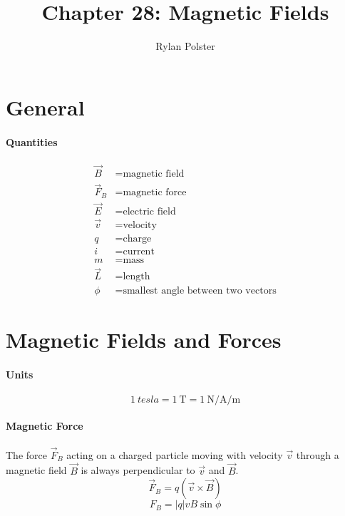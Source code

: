 \documentclass{article}
\title{Chapter 28: Magnetic Fields}
\author{Rylan Polster}
\begin{document}
    \maketitle
    
    \section*{General}

        \paragraph{Quantities}
        \begin{align}
            \vec{B} &= \text{magnetic field} \nonumber\\
            \vec{F}_B &= \text{magnetic force} \nonumber\\
            \vec{E} &= \text{electric field} \nonumber\\
            \vec{v} &= \text{velocity} \nonumber\\
            q &= \text{charge} \nonumber\\
            i &= \text{current} \nonumber\\
            m &= \text{mass} \nonumber\\
            \vec{L} &= \text{length} \nonumber\\
            \phi &= \text{smallest angle between two vectors} \nonumber
        \end{align}

    \section{Magnetic Fields and Forces}
    
        \paragraph{Units}
        \begin{equation}
            \SI{1}{tesla} = \SI{1}{\tesla} = \SI[per-mode=fraction]{1}{\newton\per\ampere\per\meter}
        \end{equation}

        \paragraph{Magnetic Force}
        The force $\vec{F}_B$ acting on a charged particle moving with velocity $\vec{v}$ through a magnetic field $\vec{B}$ is always perpendicular to $\vec{v}$ and $\vec{B}$.
        \begin{equation}
            \vec{F}_B = q \left( \vec{v} \times \vec{B} \right)
        \end{equation}
        \begin{equation}
            F_B = \left| q \right| v B \sin{\phi}
        \end{equation}
\end{document}
